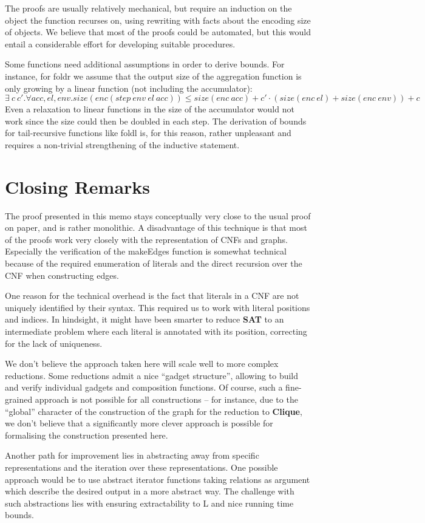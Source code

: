 \documentclass[a4paper,UKenglish,cleveref, autoref]{lipics-v2019}
\begin{document}
The proofs are usually relatively mechanical, but require an induction on the object the function recurses on, using rewriting with facts about the encoding size of objects. We believe that most of the proofs could be automated, but this would entail a considerable effort for developing suitable procedures.

Some functions need additional assumptions in order to derive bounds. For instance, for \textsf{foldr} we assume that the output size of the aggregation function is only growing by a linear function (not including the accumulator): 
\[ \exists~c~c'. \forall acc, el, env. size(enc (step~env~el~acc)) \le size(enc~acc) + c' \cdot (size(enc~el) + size(enc~env)) + c \]
Even a relaxation to linear functions in the size of the accumulator would not work since the size could then be doubled in each step.
The derivation of bounds for tail-recursive functions like \textsf{foldl} is, for this reason, rather unpleasant and requires a non-trivial strengthening of the inductive statement.

\section{Closing Remarks}
The proof presented in this memo stays conceptually very close to the usual proof on paper, and is rather monolithic. A disadvantage of this technique is that most of the proofs work very closely with the representation of CNFs and graphs. Especially the verification of the \textsf{makeEdges} function is somewhat technical because of the required enumeration of literals and the direct recursion over the CNF when constructing edges.

One reason for the technical overhead is the fact that literals in a CNF are not uniquely identified by their syntax. This required us to work with literal positions and indices. In hindsight, it might have been smarter to reduce \textbf{SAT} to an intermediate problem where each literal is annotated with its position, correcting for the lack of uniqueness.

We don't believe the approach taken here will scale well to more complex reductions. Some reductions admit a nice ``gadget structure'', allowing to build and verify individual gadgets and composition functions. Of course, such a fine-grained approach is not possible for all constructions -- for instance, due to the ``global'' character of the construction of the graph for the reduction to \textbf{Clique}, we don't believe that a significantly more clever approach is possible for formalising the construction presented here.

Another path for improvement lies in abstracting away from specific representations and the iteration over these representations. One possible approach would be to use abstract iterator functions taking relations as argument which describe the desired output in a more abstract way. The challenge with such abstractions lies with ensuring extractability to L and nice running time bounds. 

{}
\end{document}
